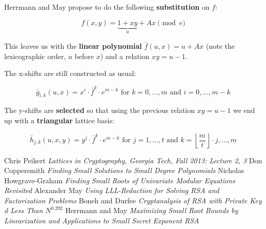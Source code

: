 \documentclass[a4paper,11pt]{article}
\begin{document}
Herrmann and May propose to do the following \textbf{substitution} on $f$:

\[ f(x,y)=\underbrace{1 + xy}_u + Ax \pmod{e} \]

This leaves us with the \textbf{linear polynomial} $\bar{f}(u, x) = u + Ax$ (note the lexicographic order, $u$ before $x$) and a relation $xy = u - 1$.

The x-shifts are still constructed as usual:

\[ \bar{g}_{i,k}(u,x) = x^i \cdot \bar{f}^k \cdot e^{m-k} \text{ for } k = 0,\hdots,m \text{ and } i=0,\hdots,m-k \]

The y-shifts are \textbf{selected} so that using the previous relation $xy = u - 1$ we end up with a \textbf{triangular} lattice basis:

\[ \bar{h}_{j,k}(u,x,y) = y^j \cdot \bar{f}^k \cdot e^{m-k} \text{ for } j = 1,\hdots,t \text{ and } k=\left\lfloor\frac{m}{t}\right\rfloor\cdot j,\hdots,m \]

\newpage
\begin{thebibliography}{1}

 Chris Peikert {\em Lattices in Cryptography, Georgia Tech, Fall 2013: Lecture 2, 3}
 Don Coppersmith {\em Finding Small Solutions to Small Degree Polynomials}
 Nicholas Howgrave-Graham {\em Finding Small Roots of Univariate Modular Equations Revisited}
 Alexander May {\em Using LLL-Reduction for Solving RSA and Factorization Problems}
 Boneh and Durfee {\em Cryptanalysis of RSA with Private Key d Less Than $N^{0.292}$}
 Herrmann and May {\em Maximizing Small Root Bounds by Linearization and Applications to Small Secret Exponent RSA}


\end{thebibliography}
\end{document}
